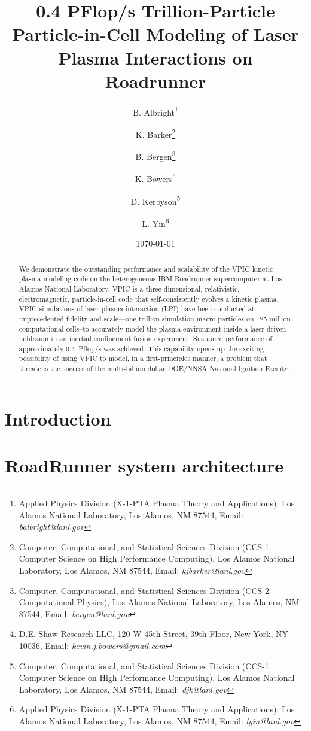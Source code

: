 \documentclass[letter,10pt]{article}
\title{0.4 PFlop/s Trillion-Particle Particle-in-Cell Modeling of Laser Plasma Interactions on Roadrunner}
\author{%
B. Albright\thanks{Applied Physics Division (X-1-PTA Plasma Theory and Applications), Los Alamos National Laboratory, Los Alamos, NM 87544, Email: \emph{balbright@lanl.gov}} \and%
%
K. Barker\thanks{Computer, Computational, and Statistical Sciences Division (CCS-1 Computer Science on High Performance Computing), Los Alamos National Laboratory, Los Alamos, NM 87544, Email: \emph{kjbarker@lanl.gov}} \and%
%
B. Bergen\thanks{Computer, Computational, and Statistical Sciences Division (CCS-2 Computational Physics), Los Alamos National Laboratory, Los Alamos, NM 87544, Email: \emph{bergen@lanl.gov}} \and%
%
K. Bowers\thanks{D.E. Shaw Research LLC, 120 W 45th Street, 39th Floor, New York, NY 10036, Email: \emph{kevin.j.bowers@gmail.com}} \and%
%
D. Kerbyson\thanks{Computer, Computational, and Statistical Sciences Division (CCS-1 Computer Science on High Performance Computing), Los Alamos National Laboratory, Los Alamos, NM 87544, Email: \emph{djk@lanl.gov}} \and%
%
L. Yin\thanks{Applied Physics Division (X-1-PTA Plasma Theory and Applications), Los Alamos National Laboratory, Los Alamos, NM 87544, Email: \emph{lyin@lanl.gov}}}
\date{\today}
\begin{document}
\maketitle
\thispagestyle{empty}

\begin{abstract}
We demonstrate the outstanding performance and scalability of the VPIC kinetic plasma modeling code on the heterogeneous IBM Roadrunner supercomputer at Los Alamos National Laboratory.  VPIC is a three-dimensional, relativistic, electromagnetic, particle-in-cell code that self-consistently evolves a kinetic plasma.  VPIC simulations of laser plasma interaction (LPI) have been conducted at unprecedented fidelity and scale---one trillion simulation macro particles on 125 million computational cells--to accurately model the plasma environment inside a laser-driven hohlraum in an inertial confinement fusion experiment.   Sustained performance of approximately 0.4~Pflop/s was achieved.  This capability opens up the exciting possibility of using VPIC to model, in a first-principles manner, a problem that threatens the success of the multi-billion dollar DOE/NNSA National Ignition Facility.  
\end{abstract}

\pagebreak

\section*{Introduction}

\section*{RoadRunner system architecture}
\end{document}
